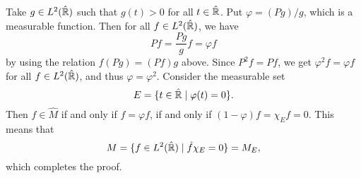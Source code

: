 \begin{pf}
    Take $g \in L^2(\hat {\mathbb{R}})$ such that $g(t) > 0$ for all $t \in \hat {\mathbb{R}}$. 
    Put $\varphi = (Pg)/g$, which is a measurable function. Then 
    for all $f \in L^2(\hat {\mathbb{R}})$, we have 
    \[ Pf = \frac{Pg}{g} f = \varphi f \] 
    by using the relation $f(Pg) = (Pf)g$ above. Since $P^2 f = Pf$, 
    we get $\varphi^2 f = \varphi f$ for all $f \in L^2(\hat{\mathbb{R}})$, and thus 
    $\varphi = \varphi^2$. Consider the measurable set 
    \[ E = \{ t \in \hat{\mathbb{R}} \mid \varphi(t) = 0 \}. \] 
    Then $f \in \hat M$ if and only if $f = \varphi f$, if and only if 
    $(1 - \varphi)f = \chi_E f = 0$. This means that 
    \[ M = \{f \in L^2(\hat {\mathbb{R}}) \mid \hat f\chi_E = 0\} = M_E, \] 
    which completes the proof. 
\end{pf}
